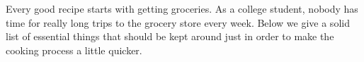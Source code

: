 \begin{center}
\textbf{}
\end{center}

Every good recipe starts with getting groceries. As a college student, nobody has time for really long trips to the grocery store every week. Below we give a solid list of essential things that should be kept around just in order to make the cooking process a little quicker. 
